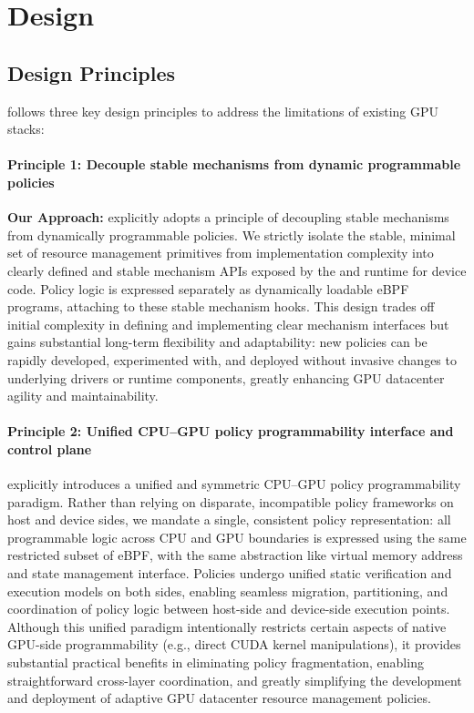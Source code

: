 \section{\sys Design}

\subsection{Design Principles}

\sys follows three key design principles to address the limitations of existing GPU stacks:

\paragraph{Principle 1: Decouple stable mechanisms from dynamic programmable policies}
\noindent\textbf{Our Approach:} \sys explicitly adopts a principle of decoupling stable mechanisms from dynamically programmable policies. We strictly isolate the stable, minimal set of resource management primitives from implementation complexity into clearly defined and stable mechanism APIs exposed by the \sysdriver and runtime for device code. Policy logic is expressed separately as dynamically loadable eBPF programs, attaching to these stable mechanism hooks. This design trades off initial complexity in defining and implementing clear mechanism interfaces but gains substantial long-term flexibility and adaptability: new policies can be rapidly developed, experimented with, and deployed without invasive changes to underlying drivers or runtime components, greatly enhancing GPU datacenter agility and maintainability.

\paragraph{Principle 2: Unified CPU--GPU policy programmability interface and control plane}
\sys explicitly introduces a unified and symmetric CPU--GPU policy programmability paradigm. Rather than relying on disparate, incompatible policy frameworks on host and device sides, we mandate a single, consistent policy representation: all programmable logic across CPU and GPU boundaries is expressed using the same restricted subset of eBPF, with the same abstraction like virtual memory address and state management interface. Policies undergo unified static verification and execution models on both sides, enabling seamless migration, partitioning, and coordination of policy logic between host-side and device-side execution points. Although this unified paradigm intentionally restricts certain aspects of native GPU-side programmability (e.g., direct CUDA kernel manipulations), it provides substantial practical benefits in eliminating policy fragmentation, enabling straightforward cross-layer coordination, and greatly simplifying the development and deployment of adaptive GPU datacenter resource management policies.

